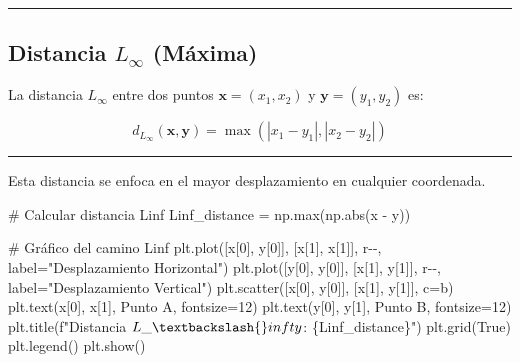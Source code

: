 \documentclass[
  letterpaper,
  DIV=11,
  numbers=noendperiod]{scrartcl}
\newenvironment{Shaded}{\begin{snugshade}}{\end{snugshade}}
\newcommand{\BuiltInTok}[1]{\textcolor[rgb]{0.00,0.23,0.31}{#1}}
\newcommand{\CommentTok}[1]{\textcolor[rgb]{0.37,0.37,0.37}{#1}}
\newcommand{\DecValTok}[1]{\textcolor[rgb]{0.68,0.00,0.00}{#1}}
\newcommand{\NormalTok}[1]{\textcolor[rgb]{0.00,0.23,0.31}{#1}}
\newcommand{\OperatorTok}[1]{\textcolor[rgb]{0.37,0.37,0.37}{#1}}
\newcommand{\SpecialCharTok}[1]{\textcolor[rgb]{0.37,0.37,0.37}{#1}}
\newcommand{\SpecialStringTok}[1]{\textcolor[rgb]{0.13,0.47,0.30}{#1}}
\newcommand{\StringTok}[1]{\textcolor[rgb]{0.13,0.47,0.30}{#1}}
\newcommand{\VariableTok}[1]{\textcolor[rgb]{0.07,0.07,0.07}{#1}}
\begin{document}
\begin{center}\rule{0.5\linewidth}{0.5pt}\end{center}

\subsection{\texorpdfstring{Distancia \(L_\infty\)
(Máxima)}{Distancia L\_\textbackslash infty (Máxima)}}\label{distancia-l_infty-muxe1xima}

La distancia \(L_\infty\) entre dos puntos \(\mathbf{x} = (x_1, x_2)\) y
\(\mathbf{y} = (y_1, y_2)\) es:

\[
d_{L_\infty}(\mathbf{x}, \mathbf{y}) = \max(|x_1 - y_1|, |x_2 - y_2|)
\]

\begin{center}\rule{0.5\linewidth}{0.5pt}\end{center}

Esta distancia se enfoca en el mayor desplazamiento en cualquier
coordenada.

\begin{Shaded}
\begin{Highlighting}[]
\CommentTok{\# Calcular distancia Linf}
\NormalTok{Linf\_distance }\OperatorTok{=}\NormalTok{ np.}\BuiltInTok{max}\NormalTok{(np.}\BuiltInTok{abs}\NormalTok{(x }\OperatorTok{{-}}\NormalTok{ y))}

\CommentTok{\# Gráfico del camino Linf}
\NormalTok{plt.plot([x[}\DecValTok{0}\NormalTok{], y[}\DecValTok{0}\NormalTok{]], [x[}\DecValTok{1}\NormalTok{], x[}\DecValTok{1}\NormalTok{]], }\StringTok{\textquotesingle{}r{-}{-}\textquotesingle{}}\NormalTok{, label}\OperatorTok{=}\StringTok{"Desplazamiento Horizontal"}\NormalTok{)}
\NormalTok{plt.plot([y[}\DecValTok{0}\NormalTok{], y[}\DecValTok{0}\NormalTok{]], [x[}\DecValTok{1}\NormalTok{], y[}\DecValTok{1}\NormalTok{]], }\StringTok{\textquotesingle{}r{-}{-}\textquotesingle{}}\NormalTok{, label}\OperatorTok{=}\StringTok{"Desplazamiento Vertical"}\NormalTok{)}
\NormalTok{plt.scatter([x[}\DecValTok{0}\NormalTok{], y[}\DecValTok{0}\NormalTok{]], [x[}\DecValTok{1}\NormalTok{], y[}\DecValTok{1}\NormalTok{]], c}\OperatorTok{=}\StringTok{\textquotesingle{}b\textquotesingle{}}\NormalTok{)}
\NormalTok{plt.text(x[}\DecValTok{0}\NormalTok{], x[}\DecValTok{1}\NormalTok{], }\StringTok{\textquotesingle{}Punto A\textquotesingle{}}\NormalTok{, fontsize}\OperatorTok{=}\DecValTok{12}\NormalTok{)}
\NormalTok{plt.text(y[}\DecValTok{0}\NormalTok{], y[}\DecValTok{1}\NormalTok{], }\StringTok{\textquotesingle{}Punto B\textquotesingle{}}\NormalTok{, fontsize}\OperatorTok{=}\DecValTok{12}\NormalTok{)}
\NormalTok{plt.title(}\SpecialStringTok{f"Distancia $L\_\textbackslash{}infty$: }\SpecialCharTok{\{}\NormalTok{Linf\_distance}\SpecialCharTok{\}}\SpecialStringTok{"}\NormalTok{)}
\NormalTok{plt.grid(}\VariableTok{True}\NormalTok{)}
\NormalTok{plt.legend()}
\NormalTok{plt.show()}
\end{Highlighting}
\end{Shaded}
\end{document}
